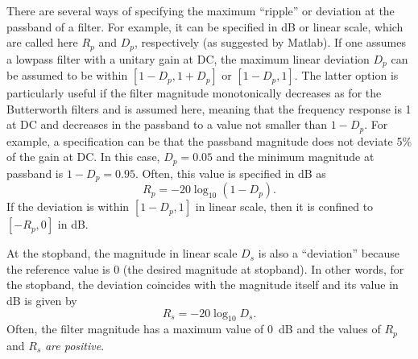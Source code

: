 There are several ways of specifying the maximum ``ripple'' %
or deviation at the passband of a filter. For example, it can be specified in dB or linear scale, which are called here $R_p$ and $D_p$, respectively (as suggested by Matlab). If one assumes a lowpass filter with a unitary gain at DC, the maximum linear deviation $D_p$ can be assumed to be within $[1-D_p, 1+D_p]$ or $[1- D_p, 1]$. The latter option is particularly useful if the filter magnitude monotonically decreases as for the Butterworth filters and is assumed here, meaning that the frequency response is 1 at DC and decreases in the passband to a value not smaller than $1-D_p$. For example, a specification can be that the passband magnitude does not deviate 5\% of the gain at DC. In this case, $D_p = 0.05$ and the minimum magnitude at passband is $1-D_p = 0.95$. Often, this value is specified in dB as 
\[
R_p = -20 \log_{10} (1-D_p).
\]
If the deviation is within $[1- D_p, 1]$ in linear scale, then it is confined to $[-R_p, 0]$ in dB.

At the stopband, the magnitude in linear scale $D_s$ is also a ``deviation'' because the reference value is 0 (the desired magnitude at stopband). In other words, for the stopband, the deviation coincides with the magnitude itself and its value in dB is given by 
\[
R_s = -20 \log_{10} D_s.
\]
Often, the filter magnitude has a maximum value of 0~dB and the values of $R_p$ and $R_s$ \emph{are positive}.

